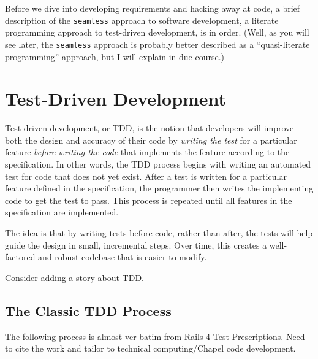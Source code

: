\label{Development_Approach}

Before we dive into developing requirements and hacking away at code, a brief description of 
the \lstinline{seamless} approach to software development, a literate programming approach to 
test-driven development, is in order.  (Well, as you will see later, the \lstinline{seamless} approach
is probably better described as a ``quasi-literate programming'' approach, but I will explain
in due course.)

\section{Test-Driven Development}
Test-driven development, or TDD, is the notion that developers will improve both the design and
accuracy of their code by \textit{writing the test} for a particular feature \textit{before writing the 
code} that implements the feature according to the specification. In other words, the TDD process 
begins with writing an automated test for code that does not yet 
exist. After a test is written for a particular feature defined in the specification, the 
programmer then writes the implementing code to get the test to pass. This process is repeated until
all features in the specification are implemented. 

The idea is that by writing tests before code, rather than after, the tests will help guide
the design in small, incremental steps. Over time, this creates a well-factored and robust
codebase that is easier to modify.

\begin{TODO}
Consider adding a story about TDD.
\end{TODO}

\subsection{The Classic TDD Process}\label{tdd-classic}

\begin{TODO} The following process is almost ver batim from Rails 4 Test Prescriptions. Need to 
cite the work and tailor to technical computing/Chapel code development.
\end{TODO}

